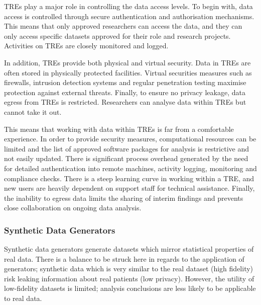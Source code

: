 \documentclass[11pt]{article}
\begin{document}
TREs play a major role in controlling the data access levels. To begin with, data access is controlled through secure authentication and authorisation mechanisms. This means that only approved researchers can access the data, and they can only access specific datasets approved for their role and research projects. Activities on TREs are closely monitored and logged.

In addition, TREs provide both physical and virtual security. Data in TREs are often stored in physically protected facilities. Virtual securities  measures such as firewalls, intrusion detection systems and regular penetration testing maximise protection against external threats.  Finally, to ensure no privacy leakage, data egress from TREs is restricted. Researchers can analyse data within TREs but cannot take it out.

This means that working with data within TREs is far from a comfortable experience. In order to provide security measures, computational resources can be limited and the list of approved software packages for analysis is restrictive and not easily updated. There is significant process overhead generated by the need for detailed authentication into remote machines, activity logging, monitoring and compliance checks. There is a steep learning curve in working within a TRE, and new users are heavily dependent on support staff for technical assistance. Finally, the inability to egress data limits the sharing of interim findings and prevents close collaboration on ongoing data analysis. 

\subsubsection{Synthetic Data Generators}


Synthetic data generators generate datasets which mirror statistical properties of real data. There is a balance to be struck here in regards to the application of generators; synthetic data which is very similar to the real dataset (high fidelity) risk leaking information about real patients (low privacy). However, the utility of low-fidelity datasets is limited; analysis conclusions are less likely to be applicable to real data.
\end{document}
